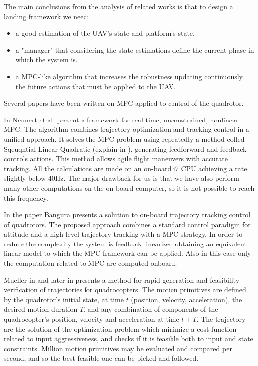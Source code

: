 The main conclusions from the analysis of related works is that to design a landing framework we need:
\begin{itemize}
\item a good estimation of the UAV's state and platform's state.
\item a "manager" that considering the state estimations define the current phase in which the system is.
\item a MPC-like algorithm that increases the robustness updating continuously the future actions that must be applied to the UAV.
\end{itemize}



Several papers have been written on MPC \cite{camacho2013model} applied to control of the quadrotor.



In \cite{neunertfast} Neunert et.al. present a framework for real-time, unconstrained, nonlinear MPC. The algorithm combines trajectory optimization and tracking control in a unified approach. It solves the MPC problem using repeatedly a method colled Sqeuqntial Linear Quadratic (explain in \cite{sideris2005efficient}), generating feedforward and feedback controls actions. This method allows agile flight maneuvers with accurate tracking. All the calculations are made on an on-board i7 CPU achieving a rate slightly below 40Hz. The major drawback for us is that we have also perform many other computations on the on-board computer, so it is not possible to reach this frequency.

In the paper \cite{bangura2014real} Bangura presents a solution to on-board trajectory tracking control of quadrotors. The
proposed approach combines a standard control paradigm for attitude and a high-level trajectory tracking with a MPC strategy. 
In order to reduce the complexity the system is feedback linearized obtaining an equivalent linear model to which the MPC framework can be applied. Also in this case only the computation related to MPC are computed onboard.

Mueller in \cite{mueller2013model} and later in \cite{mueller2015computationally} presents a method for rapid generation and feasibility verification of trajectories for quadrocopters. The motion primitives are defined by the quadrotor's initial state, at time $t$ (position, velocity, acceleration), the desired motion duration $T$, and any combination of components of the quadrocopter's
position, velocity and acceleration at time $t+T$. The trajectory are the solution of the optimization problem which minimize a
cost function related to input aggressiveness, and checks if it is feasible both to input and state constraints. Million motion primitives may be evaluated and compared per second, and so the best feasible one can be picked and followed.\\


